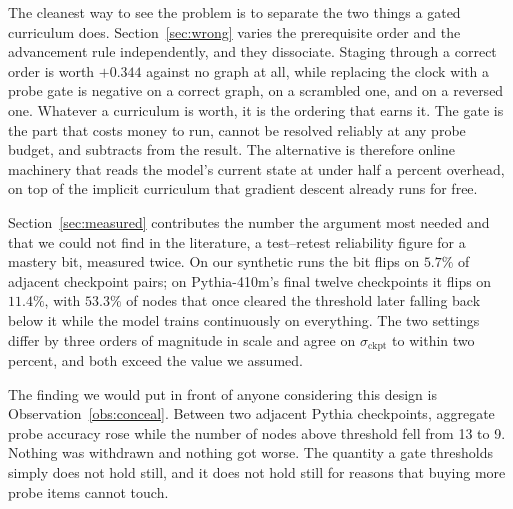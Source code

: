 \documentclass[11pt]{article}
\theoremstyle{plain}
\theoremstyle{definition}
\theoremstyle{remark}
\begin{document}
The cleanest way to see the problem is to separate the two things a gated
curriculum does. Section~\ref{sec:wrong} varies the prerequisite order and the
advancement rule independently, and they dissociate. Staging through a correct
order is worth $+0.344$ against no graph at all, while replacing the clock with a
probe gate is negative on a correct graph, on a scrambled one, and on a reversed
one. Whatever a curriculum is worth, it is the ordering that earns it. The gate
is the part that costs money to run, cannot be resolved reliably at any probe
budget, and subtracts from the result. The alternative is therefore online
machinery that reads the model's current state at under half a percent overhead,
on top of the implicit curriculum that gradient descent already runs for free.

Section~\ref{sec:measured} contributes the number the argument most needed and
that we could not find in the literature, a test--retest reliability figure for a
mastery bit, measured twice. On our synthetic runs the bit flips on $5.7\%$ of
adjacent checkpoint pairs; on Pythia-410m's final twelve checkpoints it flips on
$11.4\%$, with $53.3\%$ of nodes that once cleared the threshold later falling
back below it while the model trains continuously on everything. The two settings
differ by three orders of magnitude in scale and agree on $\sigma_{\text{ckpt}}$
to within two percent, and both exceed the value we assumed.

The finding we would put in front of anyone considering this design is
Observation~\ref{obs:conceal}. Between two adjacent Pythia checkpoints, aggregate
probe accuracy rose while the number of nodes above threshold fell from 13 to 9.
Nothing was withdrawn and nothing got worse. The quantity a gate thresholds
simply does not hold still, and it does not hold still for reasons that buying
more probe items cannot touch.



\end{document}

